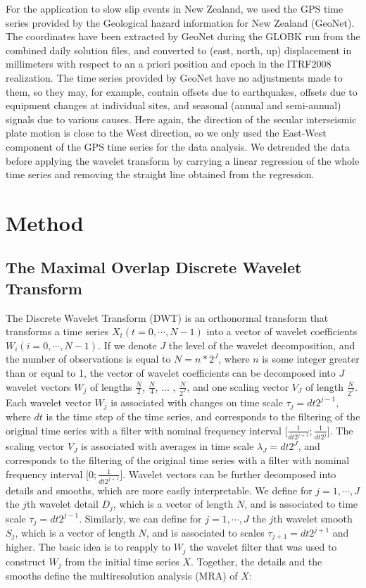 \documentclass{article}
\begin{document}
For the application to slow slip events in New Zealand, we used the GPS time series provided by the Geological hazard information for New Zealand (GeoNet). The coordinates have been extracted by GeoNet during the GLOBK run from the combined daily solution files, and converted to (east, north, up) displacement in millimeters with respect to an a priori position and epoch in the ITRF2008 realization. The time series provided by GeoNet have no adjustments made to them, so they may, for example, contain offsets due to earthquakes, offsets due to equipment changes at individual sites, and seasonal (annual and semi-annual) signals due to various causes. Here again, the direction of the secular interseismic plate motion is close to the West direction, so we only used the East-West component of the GPS time series for the data analysis. We detrended the data before applying the wavelet transform by carrying a linear regression of the whole time series and removing the straight line obtained from the regression.

\section{Method} 

\subsection{The Maximal Overlap Discrete Wavelet Transform}

The Discrete Wavelet Transform (DWT) is an orthonormal transform that transforms a time series $X_t \left( t = 0, \cdots , N - 1 \right)$ into a vector of wavelet coefficients $W_i \left( i = 0 , \cdots , N - 1 \right)$. If we denote $J$ the level of the wavelet decomposition, and the number of observations is equal to $N = n * 2^J$, where $n$ is some integer greater than or equal to 1, the vector of wavelet coefficients can be decomposed into $J$ wavelet vectors $W_j$ of lengths $\frac{N}{2}$, $\frac{N}{4}$, ... , $\frac{N}{2^J}$, and one scaling vector $V_J$ of length $\frac{N}{2^J}$. Each wavelet vector $W_j$ is associated with changes on time scale $\tau_j = dt 2^{j - 1}$, where $dt$ is the time step of the time series, and corresponds to the filtering of the original time series with a filter with nominal frequency interval $\lbrack \frac{1}{dt 2^{j + 1}} ; \frac{1}{dt 2^j} \rbrack$. The scaling vector $V_J$ is associated with averages in time scale $\lambda_J = dt 2^J$, and corresponds to the filtering of the original time series with a filter with nominal frequency interval $\lbrack 0 ; \frac{1}{dt 2^{j + 1}} \rbrack$. Wavelet vectors can be further decomposed into details and smooths, which are more easily interpretable. We define for $j = 1 , \cdots , J$ the $j$th wavelet detail $D_j$, which is a vector of length $N$, and is associated to time scale $\tau_j = dt 2^{j - 1}$. Similarly, we can define for $j = 1 , \cdots , J$ the $j$th wavelet smooth $S_j$, which is a vector of length $N$, and is associated to scales $\tau_{j + 1} = dt 2^{j + 1}$ and higher. The basic idea is to reapply to $W_j$ the wavelet filter that was used to construct $W_j$ from the initial time series $X$. Together, the details and the smooths define the multiresolution analysis (MRA) of $X$:
\end{document}
